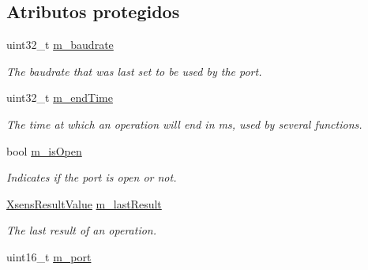 \subsection*{\-Atributos protegidos}
\begin{DoxyCompactItemize}
\item 
\hypertarget{classxsens_1_1Cmt1s_a699e276dea05aed9b120d9668228f842}{uint32\-\_\-t \hyperlink{classxsens_1_1Cmt1s_a699e276dea05aed9b120d9668228f842}{m\-\_\-baudrate}}\label{classxsens_1_1Cmt1s_a699e276dea05aed9b120d9668228f842}

\begin{DoxyCompactList}\small\item\em \-The baudrate that was last set to be used by the port. \end{DoxyCompactList}\item 
\hypertarget{classxsens_1_1Cmt1s_a0fed0152b75e196817c4d62a92bc5456}{uint32\-\_\-t \hyperlink{classxsens_1_1Cmt1s_a0fed0152b75e196817c4d62a92bc5456}{m\-\_\-end\-Time}}\label{classxsens_1_1Cmt1s_a0fed0152b75e196817c4d62a92bc5456}

\begin{DoxyCompactList}\small\item\em \-The time at which an operation will end in ms, used by several functions. \end{DoxyCompactList}\item 
\hypertarget{classxsens_1_1Cmt1s_ae24943020d686262cc9e816000f3d3bd}{bool \hyperlink{classxsens_1_1Cmt1s_ae24943020d686262cc9e816000f3d3bd}{m\-\_\-is\-Open}}\label{classxsens_1_1Cmt1s_ae24943020d686262cc9e816000f3d3bd}

\begin{DoxyCompactList}\small\item\em \-Indicates if the port is open or not. \end{DoxyCompactList}\item 
\hypertarget{classxsens_1_1Cmt1s_afe15f92b76a9f760cf769035d6a0f5dc}{\hyperlink{group__enums_ga822a2260a20af524029eef9e9a51ff6f}{\-Xsens\-Result\-Value} \hyperlink{classxsens_1_1Cmt1s_afe15f92b76a9f760cf769035d6a0f5dc}{m\-\_\-last\-Result}}\label{classxsens_1_1Cmt1s_afe15f92b76a9f760cf769035d6a0f5dc}

\begin{DoxyCompactList}\small\item\em \-The last result of an operation. \end{DoxyCompactList}\item 
\hypertarget{classxsens_1_1Cmt1s_a168c7ac9ed1e5d52f5bddbc0e104ffea}{uint16\-\_\-t \hyperlink{classxsens_1_1Cmt1s_a168c7ac9ed1e5d52f5bddbc0e104ffea}{m\-\_\-port}}\label{classxsens_1_1Cmt1s_a168c7ac9ed1e5d52f5bddbc0e104ffea}


\end{DoxyCompactItemize}
